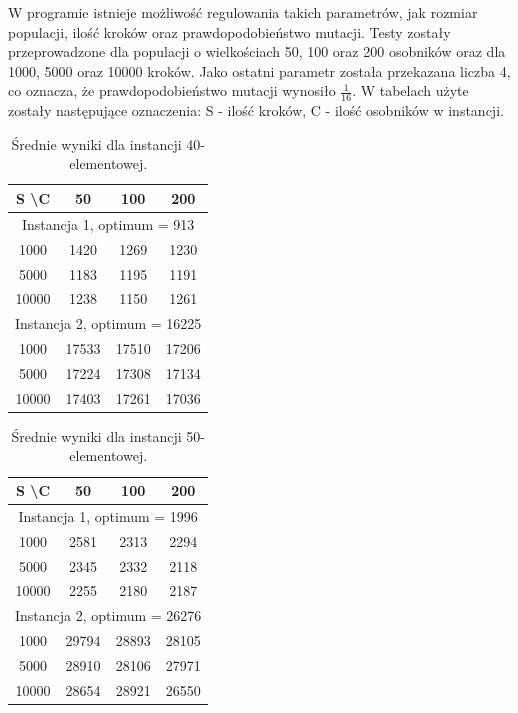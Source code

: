   W programie istnieje możliwość regulowania takich parametrów, jak rozmiar
  populacji, ilość kroków oraz prawdopodobieństwo mutacji. Testy zostały
  przeprowadzone dla populacji o wielkościach 50, 100 oraz 200 osobników oraz
  dla 1000, 5000 oraz 10000 kroków. Jako ostatni parametr została przekazana
  liczba 4, co oznacza, że prawdopodobieństwo mutacji wynosiło $\frac{1}{16}$.
  W tabelach użyte zostały następujące oznaczenia: S - ilość kroków, C - ilość
  osobników w instancji.
  \vspace{1em}

  \begin{table}[h!]
  \begin{center}
  \caption{Średnie wyniki dla instancji 40-elementowej.}
  \begin{tabular}{c|ccc}
    \hline
      S \textbackslash C & 50 & 100 & 200 \\
    \hline
      \multicolumn{4}{c}{Instancja 1, optimum = 913} \\
    \hline
      1000  & 1420 & 1269 & 1230 \\
      5000  & 1183 & 1195 & 1191 \\
      10000 & 1238 & 1150 & 1261 \\
    \hline
      \multicolumn{4}{c}{Instancja 2, optimum = 16225} \\
    \hline
      1000  & 17533 & 17510 & 17206 \\
      5000  & 17224 & 17308 & 17134 \\
      10000 & 17403 & 17261 & 17036
  \end{tabular}
  \end{center}
  \end{table}

  \begin{table}[h!]
  \begin{center}
  \caption{Średnie wyniki dla instancji 50-elementowej.}
  \begin{tabular}{c|ccc}
    \hline
      S \textbackslash C & 50 & 100 & 200 \\
    \hline
      \multicolumn{4}{c}{Instancja 1, optimum = 1996} \\
    \hline
      1000  & 2581 & 2313 & 2294 \\
      5000  & 2345 & 2332 & 2118 \\
      10000 & 2255 & 2180 & 2187 \\
    \hline
      \multicolumn{4}{c}{Instancja 2, optimum = 26276} \\
    \hline
      1000  & 29794 & 28893 & 28105 \\
      5000  & 28910 & 28106 & 27971 \\
      10000 & 28654 & 28921 & 26550
  \end{tabular}
  \end{center}
  \end{table}

